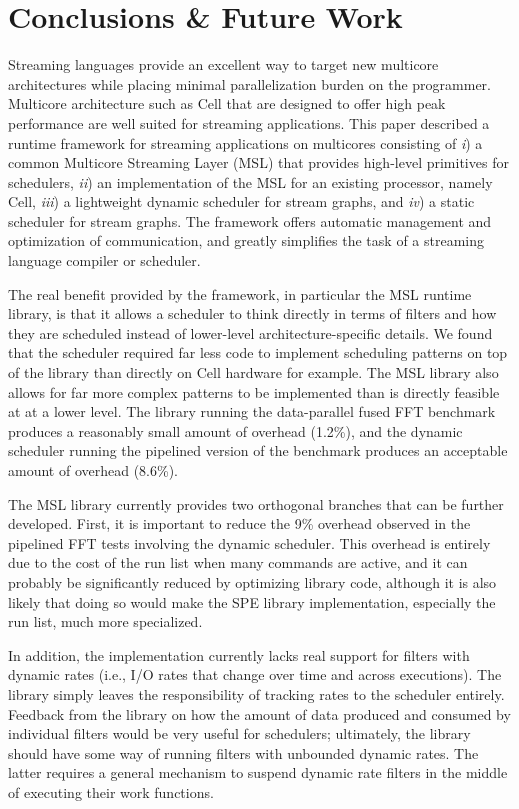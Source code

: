 \section{Conclusions \& Future Work}\label{ch:conc}

Streaming languages provide an excellent way to
target new multicore architectures while placing minimal
parallelization burden on the programmer. Multicore architecture such
as Cell that are designed to offer high peak performance are well
suited for streaming applications. This paper described a runtime
framework for streaming applications on multicores consisting of
\emph{i}) a common Multicore Streaming Layer (MSL) that provides
high-level primitives for schedulers, \emph{ii}) an implementation
of the MSL for an existing processor, namely Cell, \emph{iii}) a
lightweight dynamic scheduler for stream graphs, and \emph{iv}) a
static scheduler for stream graphs. The framework offers automatic
management and optimization of communication, and greatly
simplifies the task of a streaming language compiler or scheduler.

The real benefit provided by the framework, in particular the MSL
runtime library, is that it allows a scheduler to think directly in
terms of filters and how they are scheduled instead of lower-level
architecture-specific details. We found that the scheduler required
far less code to implement scheduling patterns on top of the library
than directly on Cell hardware for example. The MSL library also
allows for far more complex patterns to be implemented than is
directly feasible at at a lower level. The library running the
data-parallel fused FFT benchmark produces a reasonably small amount
of overhead (1.2\%), and the dynamic scheduler running the pipelined
version of the benchmark produces an acceptable amount of overhead
(8.6\%).

The MSL library currently provides two orthogonal branches that can be
further developed. First, it is important to reduce the 9\% overhead
observed in the pipelined FFT tests involving the dynamic
scheduler. This overhead is entirely due to the cost of the run list
when many commands are active, and it can probably be significantly
reduced by optimizing library code, although it is also likely that
doing so would make the SPE library implementation, especially the run
list, much more specialized.

In addition, the implementation currently lacks real support for
filters with dynamic rates (i.e., I/O rates that change over time and
across executions). The library simply leaves the responsibility of
tracking rates to the scheduler entirely. Feedback from the library on
how the amount of data produced and consumed by individual filters
would be very useful for schedulers; ultimately, the library should
have some way of running filters with unbounded dynamic rates. The
latter requires a general mechanism to suspend dynamic rate filters in
the middle of executing their work functions.

